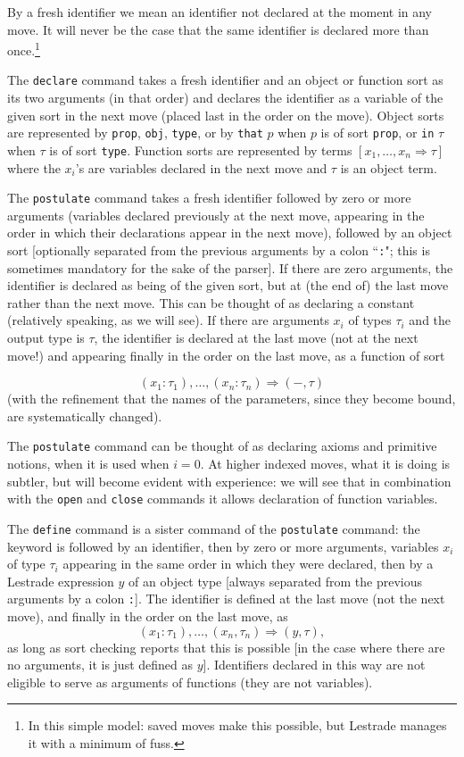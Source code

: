 \documentclass[12pt]{article}
\begin{document}
By a fresh identifier we mean an identifier not declared at the moment in any move.  It will never be the case that the same identifier is declared more than once.\footnote{In this simple model: saved moves make this possible, but Lestrade manages it with a minimum of fuss.}

The {\tt declare} command takes a fresh identifier and an object or function sort as its two arguments (in that order) and declares the identifier as a variable
of the given sort in the next move (placed last in the order on the move).   Object sorts are represented by {\tt prop}, {\tt obj}, {\tt type}, or by {\tt that} $p$ when $p$ is of sort {\tt prop}, or {\tt in} $\tau$ when $\tau$ is of sort {\tt type}.  Function sorts are represented by terms $[x_1,\ldots,x_n \Rightarrow \tau]$
where the $x_i$'s are variables declared in the next move and $\tau$ is an object term.

The {\tt postulate} command takes a fresh identifier followed by zero or more arguments (variables declared previously at the next move, appearing in the order in which their declarations appear in the next move), followed
by an object sort  [optionally separated from the previous arguments by a colon ``{\tt :}";  this is sometimes mandatory for the sake of the parser].  If there are zero arguments, the identifier is declared as being of the given sort, but at (the end of) the last move rather than the next move.  This can be thought of as declaring a constant (relatively speaking, as we will see).  If there are arguments $x_i$ of types $\tau_i$
and the output type is $\tau$, the identifier is declared at the last move (not at the next move!) and appearing finally in the order on the last move, as a function of sort

$$(x_1:\tau_1),\ldots,(x_n:\tau_n) \Rightarrow (-,\tau)$$ (with the refinement that the names of the parameters, since they become bound, are systematically changed).

The {\tt postulate} command can be thought of as declaring axioms and primitive notions, when it is used when $i=0$.  At higher indexed moves, what it is doing is subtler, but will become evident with experience:  we will see that in combination with the {\tt open} and {\tt close} commands it allows
declaration of function variables.

The {\tt define} command is a sister command of the {\tt postulate} command:  the keyword is followed by an identifier, then by zero or more arguments, variables $x_i$ of type $\tau_i$ appearing in the same order in which they were declared, then by a Lestrade expression $y$ of an object type [always separated from the previous arguments by a colon {\tt :}].  The identifier is defined at the last move (not the next move), and finally in the order on the last move,  as $$(x_1:\tau_1),\ldots,(x_n,\tau_n) \Rightarrow (y,\tau),$$ as long as sort checking reports that this is possible [in the case where there are no arguments, it is just defined as $y$].   Identifiers declared in this way are not eligible to serve as arguments of functions (they  are not variables).  
\end{document}
